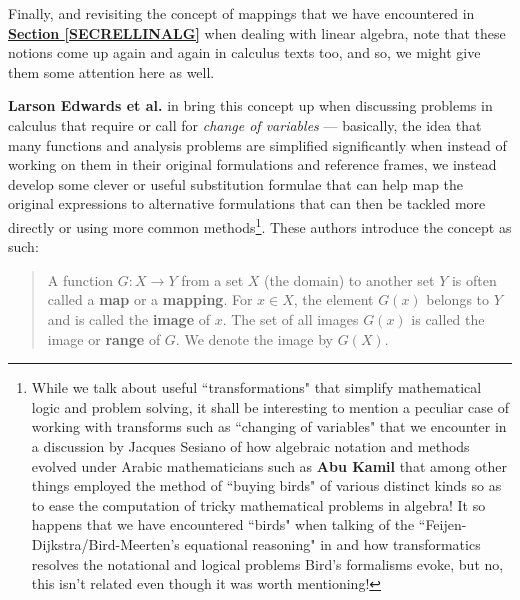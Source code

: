 \documentclass[a4paper, 18pt]{book} %
\begin{document}
\begin{appendices}
\vspace{2em}

Finally, and revisiting the concept of mappings that we have encountered in \textbf{\hyperref[SECRELLINALG]{Section \ref{SECRELLINALG}}} when dealing with linear algebra, note that these notions come up again and again in calculus texts too, and so, we might give them some attention here as well.

\vspace{2em}


\textbf{Larson Edwards et al.} in \cite{ronlarsoncalculus} bring this concept up when discussing problems in calculus that require or call for \textit{change of variables} --- basically, the idea that many functions and analysis problems are simplified significantly when instead of working on them in their original formulations and reference frames, we instead develop some clever or useful substitution formulae that can help map the original expressions to alternative formulations that can then be tackled more directly or using more common methods\footnote{While we talk about useful ``transformations" that simplify mathematical logic and problem solving, it shall be interesting to mention a peculiar case of working with transforms such as ``changing of variables" that we encounter in a discussion\cite{Sesiano2009} by Jacques Sesiano of how algebraic notation and methods evolved under Arabic mathematicians such as \textbf{Abu Kamil} that among other things employed the method of ``buying birds" of various distinct kinds so as to ease the computation of tricky mathematical problems in algebra! It so happens that we have encountered ``birds" when talking of the ``Feijen-Dijkstra/Bird-Meerten's equational reasoning" in \cite{treealgebras_review} and how transformatics resolves the notational and logical problems Bird's formalisms evoke, but no, this isn't related even though it was worth mentioning!}. These authors introduce the concept as such:


\vspace{2em}

\noindent
\begin{minipage}{1\textwidth}
\vspace{1em}
\begin{quotation}
{\ttfamily

A function $G: X \rightarrow Y$ from a set $X$ (the domain) to another set $Y$ is often called a \textbf{map} or a \textbf{mapping}. For $x \in X$, the element $G(x)$ belongs to $Y$ and is called the \textbf{image} of $x$. The set of all images $G(x)$ is called the image or \textbf{range} of $G$. We denote the image by $G(X)$.

}
\end{quotation}
\end{minipage}
\end{appendices}
\end{document}
